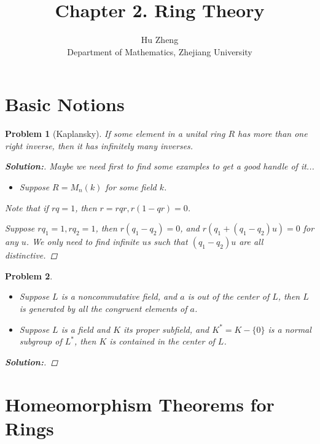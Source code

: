 \documentclass[11pt]{article}
\title{Chapter 2. Ring Theory}
\author{Hu Zheng \\ Department of Mathematics, Zhejiang University}
\newtheorem{problem}{Problem}
\numberwithin{problem}{section}
\newenvironment{solution}
               {\let\oldqedsymbol=\qedsymbol
                \renewcommand{\qedsymbol}{$\blacktriangleleft$}
                \begin{proof}[\bfseries\upshape Solution:]}
               {\end{proof}
                \renewcommand{\qedsymbol}{\oldqedsymbol}}
\begin{document}
\maketitle

\section{Basic Notions}

\begin{problem}[Kaplansky]
If some element in a unital ring $R$ has more than one right inverse, then it has infinitely many inverses.
\begin{solution}
Maybe we need first to find some examples to get a good handle of it...

\begin{itemize}
\item Suppose $R = M_n(k)$ for some field $k$.
\end{itemize}

Note that if $r q = 1$, then $r = r q r, r(1-q r) = 0$.

Suppose $r q_1=1, r q_2=1$, then $r (q_1 - q_2) = 0$, and $r (q_1 + (q_1 - q_2)u) = 0$ for any $u$. We only need to find infinite $u$s such that $(q_1 - q_2)u$ are all distinctive.

\end{solution}
\end{problem}

\begin{problem}
\begin{itemize}


\item[(1)] Suppose $L$ is a noncommutative field, and $a$ is out of the center of $L$, then $L$ is generated by all the congruent elements of $a$.
\item[(2)] Suppose $L$ is a field and $K$ its proper subfield, and $K^*=K-\{0\}$ is a normal subgroup of $L^*$, then $K$ is contained in the center of $L$.
\end{itemize}
\begin{solution}

\end{solution}

\end{problem}

\section{Homeomorphism Theorems for Rings}
\end{document}
